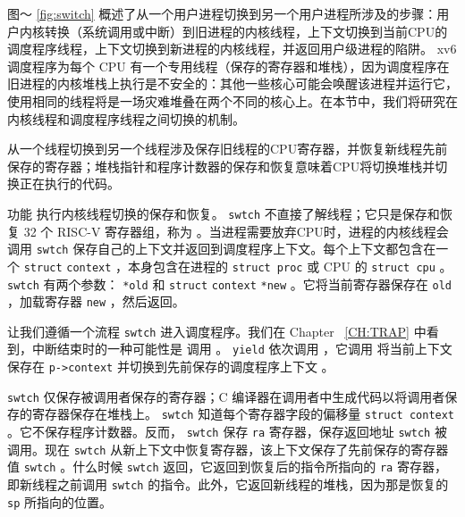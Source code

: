 \documentclass[UTF8]{article}
\begin{document}
图〜   \ref{fig:switch}   概述了从一个用户进程切换到另一个用户进程所涉及的步骤：用户内核转换（系统调用或中断）到旧进程的内核线程，上下文切换到当前CPU的调度程序线程，上下文切换到新进程的内核线程，并返回用户级进程的陷阱。 xv6 调度程序为每个 CPU 有一个专用线程（保存的寄存器和堆栈），因为调度程序在旧进程的内核堆栈上执行是不安全的：其他一些核心可能会唤醒该进程并运行它，使用相同的线程将是一场灾难堆叠在两个不同的核心上。在本节中，我们将研究在内核线程和调度程序线程之间切换的机制。  

从一个线程切换到另一个线程涉及保存旧线程的CPU寄存器，并恢复新线程先前保存的寄存器；堆栈指针和程序计数器的保存和恢复意味着CPU将切换堆栈并切换正在执行的代码。  

功能
        执行内核线程切换的保存和恢复。
    \lstinline{swtch}    不直接了解线程；它只是保存和恢复 32 个 RISC-V 寄存器组，称为
        。当进程需要放弃CPU时，进程的内核线程会调用
    \lstinline{swtch}    保存自己的上下文并返回到调度程序上下文。每个上下文都包含在一个
    \lstinline{struct}   
    \lstinline{context}   
        ，本身包含在进程的
    \lstinline{struct proc}    或 CPU 的
    \lstinline{struct cpu}    。
    \lstinline{swtch}    有两个参数：
    \lstinline{*old}    和
    \lstinline{struct}   
    \lstinline{context}   
    \lstinline{*new}    。它将当前寄存器保存在
    \lstinline{old}    ，加载寄存器
    \lstinline{new}    ，然后返回。  

让我们遵循一个流程
    \lstinline{swtch}    进入调度程序。我们在 Chapter~    \ref{CH:TRAP}    中看到，中断结束时的一种可能性是
        调用
        。
    \lstinline{yield}   依次调用
        ，它调用
        将当前上下文保存在
    \lstinline{p->context}    并切换到先前保存的调度程序上下文
        。  

   \lstinline{swtch}   
        仅保存被调用者保存的寄存器；C 编译器在调用者中生成代码以将调用者保存的寄存器保存在堆栈上。
    \lstinline{swtch}    知道每个寄存器字段的偏移量
    \lstinline{struct context}    。它不保存程序计数器。反而，
    \lstinline{swtch}    保存
    \lstinline{ra}   寄存器，保存返回地址
    \lstinline{swtch}    被调用。现在
    \lstinline{swtch}    从新上下文中恢复寄存器，该上下文保存了先前保存的寄存器值
    \lstinline{swtch}    。什么时候
    \lstinline{swtch}   返回，它返回到恢复后的指令所指向的
    \lstinline{ra}    寄存器，即新线程之前调用    \lstinline{swtch}    的指令。此外，它返回新线程的堆栈，因为那是恢复的    \lstinline{sp}    所指向的位置。  
\end{document}
